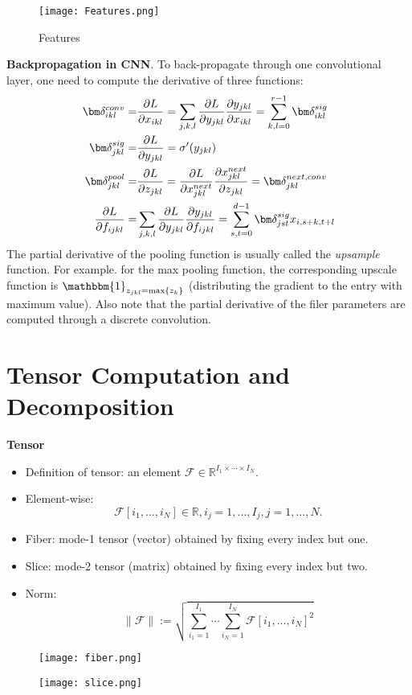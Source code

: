 \begin{figure}[ht]
\label{ffea}
\centering
\texttt{[image: Features.png]}
\caption{Features}
\end{figure}

{\bf Backpropagation in CNN}.
To back-propagate through one convolutional layer, one need to compute the derivative of three functions:
\begin{equation}
\aligned
\bm\delta^{conv}_{ikl} =& \frac{\partial L}{\partial x_{ikl}} =
\sum_{j,k,l}\frac{\partial L}{\partial y_{jkl}}\frac{\partial y_{jkl}}{\partial x_{ikl}} = \sum_{k,l=0}^{r-1}\bm\delta^{sig}_{ikl}\\
\bm\delta^{sig}_{jkl} =& \frac{\partial L}{\partial y_{jkl}} = \sigma'(y_{jkl})\\
\bm\delta^{pool}_{jkl} =& \frac{\partial L}{\partial z_{jkl}} = \frac{\partial L}{\partial x^{next}_{jkl}}\frac{\partial x^{next}_{jkl}}{\partial z_{jkl}} = \bm\delta^{next, conv}_{jkl}\\
\frac{\partial L}{\partial f_{ijkl}} =& \sum_{j,k,l}\frac{\partial L}{\partial y_{jkl}}\frac{\partial y_{jkl}}{\partial f_{ijkl}}=\sum_{s,t=0}^{d-1}\bm\delta^{sig}_{jst}x_{i, s+k, t+l}
\endaligned
\end{equation}
The partial derivative of the pooling function is usually called the \textit{upsample} function. For example. for the max pooling function, the corresponding upscale function is $\mathbbm{1}_{z_{jkl} = \max\{z_k\}}$ (distributing the gradient to the entry with maximum value). Also note that the partial derivative of the filer parameters are computed through a discrete convolution.









\section{Tensor Computation and Decomposition}

{\bf Tensor}
\begin{itemize}
\item
Definition of tensor: an element $\mathcal{F}\in\mathbb{R}^{I_1\times\cdots\times I_N}$.
\item
Element-wise: 
$$
\mathcal{F}[i_1,...,i_N]\in\mathbb{R}, i_j=1,...,I_j, j=1,...,N.
$$
\item
Fiber: mode-1 tensor (vector) obtained by fixing every index but one.
\item
Slice: mode-2 tensor (matrix) obtained by fixing every index but two.
\item
Norm: 
$$
\|\mathcal{F}\| := \sqrt{\sum_{i_1=1}^{I_1}\cdots\sum_{i_N=1}^{I_N} \mathcal{F}[i_1,...,i_N]^2}
$$
\end{itemize}
\begin{figure}[ht]
\centering
\texttt{[image: fiber.png]}
\end{figure}
\begin{figure}[ht]
\centering
\texttt{[image: slice.png]}
\end{figure}

